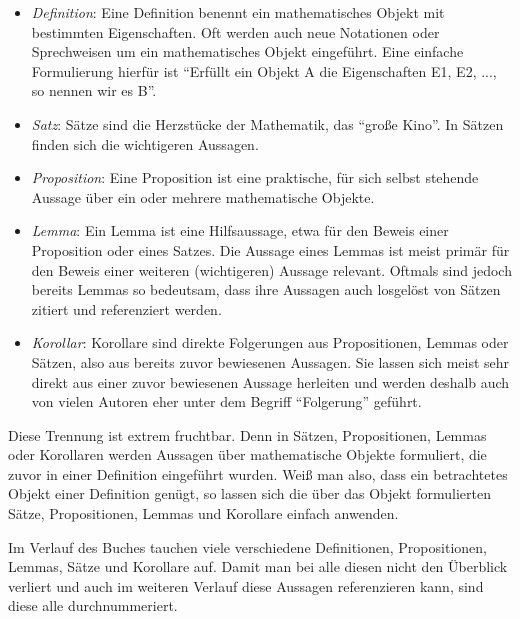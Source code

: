 \begin{itemize}
    \item \textit{Definition}: Eine Definition benennt ein mathematisches Objekt mit bestimmten Eigenschaften. Oft werden auch neue Notationen oder Sprechweisen um ein mathematisches Objekt eingeführt. Eine einfache Formulierung hierfür ist "`Erfüllt ein Objekt A die Eigenschaften E1, E2, ..., so nennen wir es B"'. 
    
    \item \textit{Satz}: Sätze sind die Herzstücke der Mathematik, das "`große Kino"'. In Sätzen finden sich die wichtigeren Aussagen.  
    
    \item \textit{Proposition}: Eine Proposition ist eine praktische, für sich selbst stehende Aussage über ein oder mehrere mathematische Objekte.  

    \item \textit{Lemma}: Ein Lemma ist eine Hilfsaussage, etwa für den Beweis einer Proposition oder eines Satzes. Die Aussage eines Lemmas ist meist primär für den Beweis einer weiteren (wichtigeren) Aussage relevant. Oftmals sind jedoch bereits Lemmas so bedeutsam, dass ihre Aussagen auch losgelöst von Sätzen zitiert und referenziert werden. 

    \item \textit{Korollar}: Korollare sind direkte Folgerungen aus Propositionen, Lemmas oder Sätzen, also aus bereits zuvor bewiesenen Aussagen. Sie lassen sich meist sehr direkt aus einer zuvor bewiesenen Aussage herleiten und werden deshalb auch von vielen Autoren eher unter dem Begriff "`Folgerung"' geführt. 
\end{itemize}
Diese Trennung ist extrem fruchtbar. Denn in Sätzen, Propositionen, Lemmas oder Korollaren werden Aussagen über mathematische Objekte formuliert, die zuvor in einer Definition eingeführt wurden. Weiß man also, dass ein betrachtetes Objekt einer Definition genügt, so lassen sich die über das Objekt formulierten Sätze, Propositionen, Lemmas und Korollare einfach anwenden. 

Im Verlauf des Buches tauchen viele verschiedene Definitionen, Propositionen, Lemmas, Sätze und Korollare auf. Damit man bei alle diesen nicht den Überblick verliert und auch im weiteren Verlauf diese Aussagen referenzieren kann, sind diese alle durchnummeriert. 

